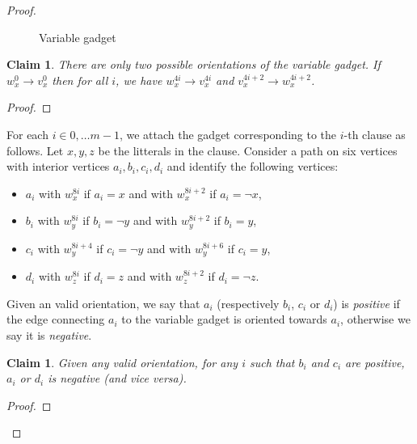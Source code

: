 \documentclass[11pt,a4aper]{article}
\newtheorem{claim}[lemma]{Claim}
\theoremstyle{definition}
\begin{document}
\begin{proof}
\begin{figure}[h!]
    \caption{Variable gadget}
    \label{fig:variable_gadget}    
  \end{figure}

  \begin{claim}\label{cl:variable_alternating}
    There are only two possible orientations of the variable gadget. If
    $w_x^0 \to v_x^0$ then for all $i$, we have $w_x^{4i} \to v_x^{4i}$ and
    $v_x^{4i+2} \to w_x^{4i+2}$.
  \end{claim}
  \begin{proof}
  \end{proof}
  
  For each $i \in {0, \dots m-1}$, we attach the gadget corresponding to the
  $i$-th clause as follows. Let $x, y, z$ be the litterals in the
  clause. Consider a path on six vertices with interior vertices
  $a_i,b_i,c_i,d_i$ and identify the following vertices:

  \begin{itemize}
  \item $a_i$ with $w_x^{8i}$ if $a_i = x$ and with $w_x^{8i+2}$ if
    $a_i = \neg x$,
  \item $b_i$ with $w_y^{8i}$ if $b_i = \neg y$ and with $w_y^{8i+2}$ if
    $b_i = y$,
  \item $c_i$ with $w_y^{8i+4}$ if $c_i = \neg y$ and with $w_y^{8i+6}$ if
    $c_i = y$,
  \item $d_i$ with $w_z^{8i}$ if $d_i = z$ and with $w_z^{8i+2}$ if
    $d_i = \neg z$.
  \end{itemize}

  Given an valid orientation, we say that $a_i$ (respectively $b_i$, $c_i$ or
  $d_i$) is \emph{positive} if the edge connecting $a_i$ to the variable gadget
  is oriented towards $a_i$, otherwise we say it is \emph{negative}.
  \begin{claim}
    Given any valid orientation, for any $i$ such that $b_i$ and $c_i$ are
    positive, $a_i$ or $d_i$ is negative (and vice versa).
  \end{claim}

  \begin{proof}
  \end{proof}
\end{proof}

\nocite{*}


\end{document}
